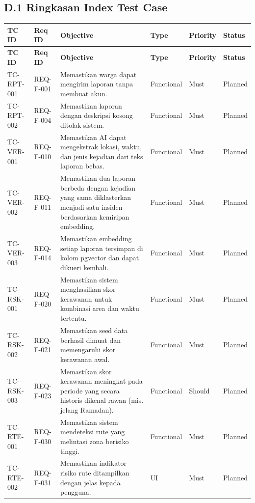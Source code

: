 \documentclass[11pt,a4paper]{article}
\begin{document}
\subsection*{D.1 Ringkasan Index Test Case}
\footnotesize
\begin{longtable}{|L{2.0cm}|L{1.8cm}|L{5.8cm}|L{1.7cm}|L{1.4cm}|L{1.3cm}|}
\hline
{}\textbf{TC ID} & \textbf{Req ID} & \textbf{Objective} & \textbf{Type} & \textbf{Priority} & \textbf{Status} \\ \hline
\endfirsthead
\hline
{}\textbf{TC ID} & \textbf{Req ID} & \textbf{Objective} & \textbf{Type} & \textbf{Priority} & \textbf{Status} \\ \hline
\endhead
TC-RPT-001 & REQ-F-001 & Memastikan warga dapat mengirim laporan tanpa membuat akun. & Functional & Must & Planned \\ \hline
TC-RPT-002 & REQ-F-004 & Memastikan laporan dengan deskripsi kosong ditolak sistem. & Functional & Must & Planned \\ \hline
TC-VER-001 & REQ-F-010 & Memastikan AI dapat mengekstrak lokasi, waktu, dan jenis kejadian dari teks laporan bebas. & Functional & Must & Planned \\ \hline
TC-VER-002 & REQ-F-011 & Memastikan dua laporan berbeda dengan kejadian yang sama diklasterkan menjadi satu insiden berdasarkan kemiripan embedding. & Functional & Must & Planned \\ \hline
TC-VER-003 & REQ-F-014 & Memastikan embedding setiap laporan tersimpan di kolom pgvector dan dapat dikueri kembali. & Functional & Must & Planned \\ \hline
TC-RSK-001 & REQ-F-020 & Memastikan sistem menghasilkan skor kerawanan untuk kombinasi area dan waktu tertentu. & Functional & Must & Planned \\ \hline
TC-RSK-002 & REQ-F-021 & Memastikan seed data berhasil dimuat dan memengaruhi skor kerawanan awal. & Functional & Must & Planned \\ \hline
TC-RSK-003 & REQ-F-023 & Memastikan skor kerawanan meningkat pada periode yang secara historis dikenal rawan (mis. jelang Ramadan). & Functional & Should & Planned \\ \hline
TC-RTE-001 & REQ-F-030 & Memastikan sistem mendeteksi rute yang melintasi zona berisiko tinggi. & Functional & Must & Planned \\ \hline
TC-RTE-002 & REQ-F-031 & Memastikan indikator risiko rute ditampilkan dengan jelas kepada pengguna. & UI & Must & Planned \\ \hline

\end{longtable}
\end{document}
